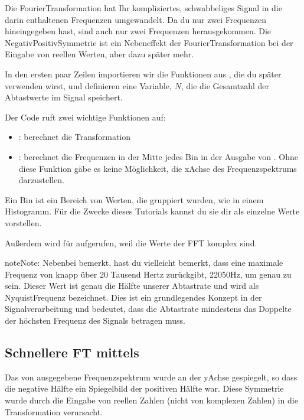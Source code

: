\documentclass[letterpaper,10pt,english]{jupyterBook}
\begin{document}
\sphinxAtStartPar
Die Fourier\sphinxhyphen{}Transformation hat Ihr kompliziertes, schwabbeliges Signal in die darin enthaltenen Frequenzen umgewandelt. Da du nur zwei Frequenzen hineingegeben hast, sind auch nur zwei Frequenzen herausgekommen. Die Negativ\sphinxhyphen{}Positiv\sphinxhyphen{}Symmetrie ist ein Nebeneffekt der Fourier\sphinxhyphen{}Transformation bei der Eingabe von reellen Werten, aber dazu später mehr.

\sphinxAtStartPar
In den ersten paar Zeilen importieren wir die Funktionen aus , die du später verwenden wirst, und definieren eine Variable, \(N\), die die Gesamtzahl der Abtastwerte im Signal speichert.

\sphinxAtStartPar
Der Code ruft zwei wichtige Funktionen auf:
\begin{itemize}
\item {} 
\sphinxAtStartPar
{}: berechnet die Transformation

\item {} 
\sphinxAtStartPar
{}: berechnet die Frequenzen in der Mitte jedes Bin in der Ausgabe von . Ohne diese Funktion gäbe es keine Möglichkeit, die x\sphinxhyphen{}Achse des Frequenzspektrums darzustellen.

\end{itemize}

\sphinxAtStartPar
Ein Bin ist ein Bereich von Werten, die gruppiert wurden, wie in einem Histogramm. Für die Zwecke dieses Tutorials kannst du sie dir als einzelne Werte vorstellen.

\sphinxAtStartPar
Außerdem wird  für  aufgerufen, weil die Werte der FFT komplex sind.

\begin{sphinxadmonition}{note}{Note:}
\sphinxAtStartPar
Nebenbei bemerkt, hast du vielleicht bemerkt, dass  eine maximale Frequenz von knapp über 20 Tausend Hertz zurückgibt, 22050Hz, um genau zu sein. Dieser Wert ist genau die Hälfte unserer Abtastrate und wird als Nyquist\sphinxhyphen{}Frequenz bezeichnet.
Dies ist ein grundlegendes Konzept in der Signalverarbeitung und bedeutet, dass die Abtastrate mindestens das Doppelte der höchsten Frequenz des Signals betragen muss.
\end{sphinxadmonition}


\subsection{Schnellere  FT mittels }
\label{\detokenize{content/T_Spektralanalyse_Audio:schnellere-fast-ft-mittels-rfft}}
\sphinxAtStartPar
Das von  ausgegebene Frequenzspektrum wurde an der y\sphinxhyphen{}Achse gespiegelt, so dass die negative Hälfte ein Spiegelbild der positiven Hälfte war. Diese Symmetrie wurde durch die Eingabe von reellen Zahlen (nicht von komplexen Zahlen) in die Transformation verursacht.
\end{document}
